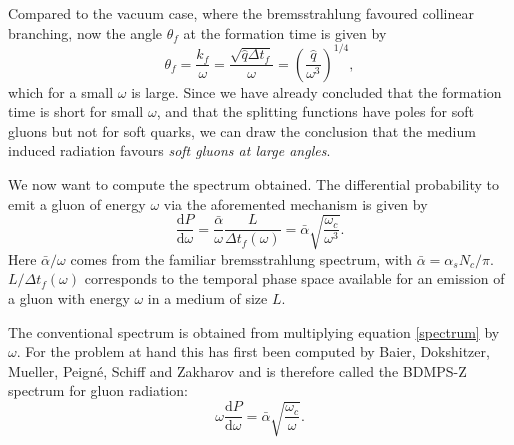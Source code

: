 \documentclass[a4paper,12pt]{article}
\numberwithin{equation}{section}
\begin{document}
Compared to the vacuum case, where the bremsstrahlung favoured collinear branching, now the angle $\theta_f$ at the formation time is given by
\begin{equation}
\theta_f=\frac{k_f}{\omega}=\frac{\sqrt{\hat{q}\Delta t_f}}{\omega}=\left( \frac{\hat{q}}{\omega^3} \right)^{1/4},
\end{equation}
which for a small $\omega$ is large. Since we have already concluded that the formation time is short for small $\omega$, and that the splitting functions have poles for soft gluons but not for soft quarks, we can draw the conclusion that the medium induced radiation favours \emph{soft gluons at large angles}.



We now want to compute the spectrum obtained. The differential probability to emit a gluon of energy $\omega$ via the aforemented mechanism is given by 
\begin{equation}\label{spectrum}
\frac{\mathrm{d}P}{\mathrm{d}\omega} =\frac{\bar{\alpha}}{\omega}\frac{L}{\Delta t_f(\omega)}= \bar{\alpha}\sqrt{\frac{\omega_c}{\omega^3}}.
\end{equation}
Here ${\bar{\alpha}}/{\omega}$ comes from the familiar bremsstrahlung spectrum, with $\bar{\alpha}={\alpha_s N_c}/{\pi}$. ${L}/{\Delta t_f(\omega)}$ corresponds to the temporal phase space available for an emission of a gluon with energy $\omega$ in a medium of size $L$. 

The conventional spectrum is obtained from multiplying equation \eqref{spectrum} by $\omega$. For the problem at hand this has first been computed by Baier, Dokshitzer, Mueller, Peigné, Schiff and Zakharov and is therefore called the BDMPS-Z spectrum for gluon radiation\cite{Baier:1996kr,Zakharov:1997uu}:
\begin{equation}\label{BDMPS}
\omega \frac{\mathrm{d}P}{\mathrm{d}\omega} =\bar{\alpha}\sqrt{\frac{\omega_c}{\omega}}.
\end{equation}
\end{document}
